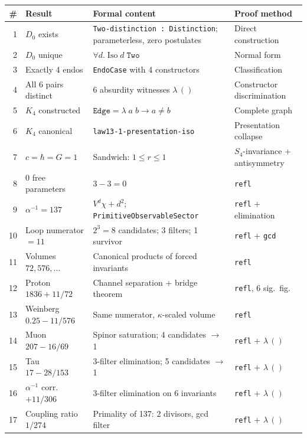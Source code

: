 \documentclass[11pt,a4paper]{article}
\theoremstyle{definition}
\begin{document}
\begin{center}
\small
\renewcommand{\arraystretch}{1.3}
\begin{tabular}{@{}rlp{5.5cm}p{3.5cm}@{}}
\toprule
\textbf{\#} & \textbf{Result} & \textbf{Formal content} & \textbf{Proof method} \\
\midrule
1  & $D_0$ exists          & \texttt{Two-distinction : Distinction}; parameterless, zero postulates & Direct construction \\
2  & $D_0$ unique           & $\forall d.\;\mathrm{Iso}\;d\;\mathtt{Two}$ & Normal form \\
3  & Exactly 4 endos        & \texttt{EndoCase} with 4 constructors & Classification \\
4  & All 6 pairs distinct   & 6 absurdity witnesses $\lambda\,()$ & Constructor discrimination \\
5  & $K_4$ constructed      & $\mathtt{Edge} = \lambda\;a\;b \to a \neq b$ & Complete graph \\
6  & $K_4$ canonical        & \texttt{law13-1-presentation-iso} & Presentation collapse \\
7  & $c = \hbar = G = 1$   & Sandwich: $1 \leq r \leq 1$ & $S_4$-invariance + antisymmetry \\
8  & 0 free parameters      & $3 - 3 = 0$ & \texttt{refl} \\
9  & $\alpha^{-1} = 137$    & $V^d\chi + d^2$; \texttt{PrimitiveObservableSector} & \texttt{refl} + elimination \\
10 & Loop numerator $= 11$  & $2^3 = 8$ candidates; 3 filters; 1 survivor & \texttt{refl} + \texttt{gcd} \\
11 & Volumes $72, 576, \ldots$ & Canonical products of forced invariants & \texttt{refl} \\
12 & Proton $1836 + 11/72$  & Channel separation + bridge theorem & \texttt{refl}, 6 sig.\ fig.\ \\
13 & Weinberg $0.25 - 11/576$ & Same numerator, $\kappa$-scaled volume & \texttt{refl} \\
14 & Muon $207 - 16/69$     & Spinor saturation; 4 candidates $\to$ 1 & \texttt{refl} + $\lambda\,()$ \\
15 & Tau $17 - 28/153$      & 3-filter elimination; 5 candidates $\to$ 1 & \texttt{refl} + $\lambda\,()$ \\
16 & $\alpha^{-1}$ corr.\ $+11/306$ & 3-filter elimination on 6 invariants & \texttt{refl} + $\lambda\,()$ \\
17 & Coupling ratio $1/274$  & Primality of 137: 2 divisors, gcd filter & \texttt{refl} + $\lambda\,()$ \\

\end{tabular}
\end{center}
\end{document}
